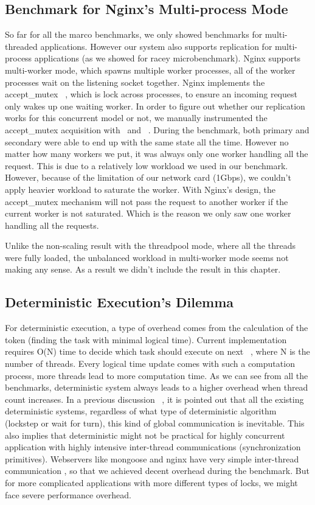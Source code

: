 \subsection{Benchmark for Nginx's Multi-process Mode}
So far for all the marco benchmarks, we only showed benchmarks for multi-threaded applications. However our system also supports replication for multi-process applications (as we showed for racey microbenchmark). Nginx supports multi-worker mode, which spawns multiple worker processes, all of the worker processes wait on the listening socket together. Nginx implements the accept\_mutex ~\cite{nginxscalability}, which is lock across processes, to ensure an incoming request only wakes up one waiting worker. In order to figure out whether our replication works for this concurrent model or not, we manually instrumented the accept\_mutex acquisition with \detstart\ and \detend\ . During the benchmark, both primary and secondary were able to end up with the same state all the time. However no matter how many workers we put, it was always only one worker handling all the request. This is due to a relatively low workload we used in our benchmark. However, because of the limitation of our network card (1Gbps), we couldn't apply heavier workload to saturate the worker. With Nginx's design, the accept\_mutex mechanism will not pass the request to another worker if the current worker is not saturated. Which is the reason we only saw one worker handling all the requests.

Unlike the non-scaling result with the threadpool mode, where all the threads were fully loaded, the unbalanced workload in multi-worker mode seems not making any sense. As a result we didn't include the result in this chapter.

\subsection{Deterministic Execution's Dilemma}
For deterministic execution, a type of overhead comes from the calculation of the token (finding the task with minimal logical time). Current implementation requires O(N) time to decide which task should execute on next \detstart\ , where N is the number of threads. Every logical time update comes with such a computation process, more threads lead to more computation time.  As we can see from all the benchmarks, deterministic system always leads to a higher overhead when thread count increases. In a previous discussion ~\cite{bergan2011deterministic}, it is pointed out that all the existing deterministic systems, regardless of what type of deterministic algorithm (lockstep or wait for turn), this kind of global communication is inevitable. This also implies that deterministic might not be practical for highly concurrent application with highly intensive inter-thread communications (synchronization primitives). Webservers like mongoose and nginx have very simple inter-thread communication , so that we achieved decent overhead during the benchmark. But for more complicated applications with more different types of locks, we might face severe performance overhead.

